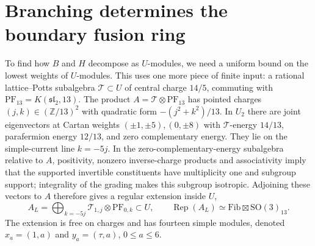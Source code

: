\documentclass[11pt,a4paper]{article}
\DeclareMathOperator{\Rep}{Rep}
\newcommand{\ZZ}{\mathbb Z}
\newcommand{\PF}{\mathrm{PF}}
\begin{document}
\section{Branching determines the boundary fusion ring}\label{sec:branching}
To find how $B$ and $H$ decompose as $U$-modules, we need a uniform
bound on the lowest weights of $U$-modules. This uses one more piece of
finite input: a rational lattice--Potts subalgebra
$\mathcal T\subset U$ of central charge $14/5$, commuting with
$\PF_{13}=K(\mathfrak{sl}_2,13)$. The product
$A=\mathcal T\otimes\PF_{13}$ has pointed charges
$(j,k)\in(\ZZ/13)^2$ with quadratic form $-(j^2+k^2)/13$.
In $U_2$ there are joint eigenvectors at Cartan weights
$(\pm1,\pm5),(0,\pm8)$ with $\mathcal T$-energy $14/13$, parafermion
energy $12/13$, and zero complementary energy. They lie on the
simple-current line $k=-5j$. In the zero-complementary-energy subalgebra
relative to $A$, positivity, nonzero inverse-charge products and
associativity imply that the supported invertible constituents have multiplicity one and
subgroup support; integrality of the grading makes this subgroup
isotropic. Adjoining these vectors to $A$ therefore gives a regular
extension inside $U$,
\begin{equation}\label{eq:core}
 A_L=\bigoplus_{k=-5j}\mathcal T_{1,j}\otimes\PF_{0,k}\subset U,
 \qquad \Rep(A_L)\simeq\mathrm{Fib}\boxtimes\mathrm{SO}(3)_{13}.
\end{equation}
The extension is free on charges and has fourteen simple modules,
denoted $x_a=(1,a)$ and $y_a=(\tau,a)$, $0\le a\le6$.
\end{document}
